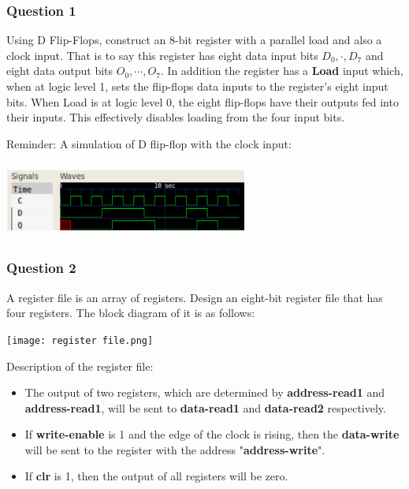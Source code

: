 \documentclass[11pt]{article}
\begin{document}
\bigskip

\subsubsection*{Question 1}
Using D Flip-Flops, construct an 8-bit register with a parallel load and also a clock input. That is to say this register has eight data input bits $D_0,\cdot,D_7$ and eight data output bits $O_0,\cdots,O_7$. In addition the register has a \textbf{Load} input which, when at logic level 1, sets the flip-flops data inputs to the register's eight input bits. When Load is at logic level 0, the eight flip-flops have their outputs fed into their inputs. This effectively disables loading from the four input bits.



\bigskip

Reminder: A simulation of D flip-flop with the clock input:

\begin{center}
\includegraphics[width=8cm, height=2.5cm]{D.png}
\end{center}





\subsubsection*{Question 2}
A register file is an array of registers. Design an eight-bit register file that has four registers. The block diagram of it is as follows: 

\begin{center}
\texttt{[image: register file.png]}    
\end{center}

Description of the register file: 

\begin{itemize}
    \item The output of two registers, which are determined by \textbf{address-read1} and \textbf{address-read1}, will be sent to \textbf{data-read1} and \textbf{data-read2} respectively.
    \item If \textbf{write-enable} is 1 and the edge of the clock is rising, then the \textbf{data-write} will be sent to the register with the address "\textbf{address-write}".
    \item If \textbf{clr} is 1, then the output of all registers will be zero. 
\end{itemize}
\end{document}
